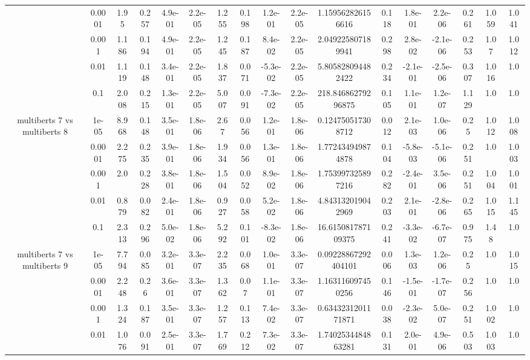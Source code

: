 \begin{tabular}{|c|c|c|c|c|c|c|c|c|c|c|c|c|c|c|c|c|}
 & 0.0001 & 1.95 & 0.257 & 4.9e-01 & 2.2e-05 & 1.255 & 0.198 & 1.2e-01 & 2.2e-05 & 1.159562826156616 & 0.118 & 1.8e-01 & 2.2e-06 & 0.261 & 1.059 & 1.041 \\
 & 0.001 & 1.186 & 0.194 & 4.9e-01 & 2.2e-05 & 1.245 & 0.187 & 8.4e-02 & 2.2e-05 & 2.049225807189941 & 0.298 & 2.8e-02 & -2.1e-06 & 0.253 & 1.07 & 1.012 \\
 & 0.01 & 1.119 & 0.148 & 3.4e-01 & 2.2e-05 & 1.837 & 0.071 & -5.3e-02 & 2.2e-05 & 5.805828094482422 & 0.234 & -2.1e-01 & -2.5e-06 & 0.307 & 1.016 & 1.0 \\
 & 0.1 & 2.008 & 0.215 & 1.3e-01 & 2.2e-05 & 5.007 & 0.091 & -7.3e-02 & 2.2e-05 & 218.84686279296875 & 0.105 & 1.1e-01 & 1.2e-07 & 1.129 & 1.0 & 1.0 \\
\hline
\multirow{5}{*}{multiberts 7 vs multiberts 8} & 1e-05 & 8.968 & 0.148 & 3.5e-01 & 1.8e-06 & 2.67 & 0.056 & 1.2e-01 & 1.8e-06 & 0.124750517308712 & 0.012 & 2.1e-03 & 1.0e-06 & 0.25 & 1.012 & 1.008 \\
 & 0.0001 & 2.275 & 0.235 & 3.9e-01 & 1.8e-06 & 1.934 & 0.056 & 1.3e-01 & 1.8e-06 & 1.772434949874878 & 0.104 & -5.8e-03 & -5.1e-06 & 0.251 & 1.0 & 1.003 \\
 & 0.001 & 2.0 & 0.228 & 3.8e-01 & 1.8e-06 & 1.504 & 0.052 & 8.9e-02 & 1.8e-06 & 1.753997325897216 & 0.282 & -2.4e-01 & 3.5e-06 & 0.251 & 1.004 & 1.001 \\
 & 0.01 & 0.879 & 0.082 & 2.4e-01 & 1.8e-06 & 0.927 & 0.058 & 5.2e-02 & 1.8e-06 & 4.843132019042969 & 0.203 & 2.1e-01 & -2.8e-06 & 0.265 & 1.015 & 1.145 \\
 & 0.1 & 2.313 & 0.296 & 5.0e-02 & 1.8e-06 & 5.292 & 0.101 & -8.3e-02 & 1.8e-06 & 16.615081787109375 & 0.241 & -3.3e-02 & -6.7e-07 & 0.975 & 1.48 & 1.0 \\
\hline
\multirow{5}{*}{multiberts 7 vs multiberts 9} & 1e-05 & 7.794 & 0.085 & 3.2e-01 & 3.3e-07 & 2.235 & 0.068 & 1.0e-01 & 3.3e-07 & 0.09228867292404101 & 0.006 & 1.3e-03 & 1.2e-06 & 0.25 & 1.0 & 1.015 \\
 & 0.0001 & 2.248 & 0.26 & 3.6e-01 & 3.3e-07 & 1.362 & 0.07 & 1.1e-01 & 3.3e-07 & 1.163116097450256 & 0.146 & -1.5e-01 & -1.7e-07 & 0.256 & 1.0 & 1.0 \\
 & 0.001 & 1.324 & 0.187 & 3.5e-01 & 3.3e-07 & 1.257 & 0.113 & 7.4e-02 & 3.3e-07 & 0.6343231201171871 & 0.038 & -2.3e-02 & 5.0e-07 & 0.251 & 1.002 & 1.0 \\
 & 0.01 & 1.076 & 0.091 & 2.5e-01 & 3.3e-07 & 1.769 & 0.212 & 7.3e-02 & 3.3e-07 & 1.7402534484863281 & 0.131 & 2.0e-01 & 4.9e-06 & 0.503 & 1.003 & 1.0 \\

\end{tabular}

